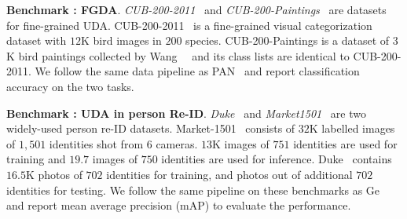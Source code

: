 \documentclass[10pt,twocolumn,letterpaper]{article}
\begin{document}
\textbf{Benchmark : FGDA}. \textit{CUB-200-2011}~\cite{wah2011CUB-200-2011} and \textit{CUB-200-Paintings}~\cite{wang2020PAN} are datasets for fine-grained UDA.
CUB-200-2011~\cite{wah2011CUB-200-2011} is a fine-grained visual categorization dataset with $12$K bird images in $200$ species.
CUB-200-Paintings is a dataset of $3$K bird paintings collected by Wang~\etal~\cite{wang2020PAN} and its class lists are identical to CUB-200-2011. We follow the same data pipeline as PAN~\cite{wang2020PAN} and report classification accuracy on the two tasks.

\textbf{Benchmark : UDA in person Re-ID}. \textit{Duke}~\cite{ristani2016Duke} and \textit{Market1501}~\cite{zheng2015Market1501} are two widely-used person re-ID datasets. Market-1501~\cite{zheng2015Market1501} consists of $32$K labelled images of $1,501$ identities shot from $6$ cameras. $13$K images of $751$ identities are used for training and $19.7$ images of $750$ identities are used for inference. Duke~\cite{ristani2016Duke} contains $16.5$K photos of $702$ identities for training, and photos out of additional $702$ identities for testing. We follow the same pipeline on these benchmarks as Ge~\etal~\cite{ge2020MMT} and report mean average precision (mAP) to evaluate the performance.
\end{document}
